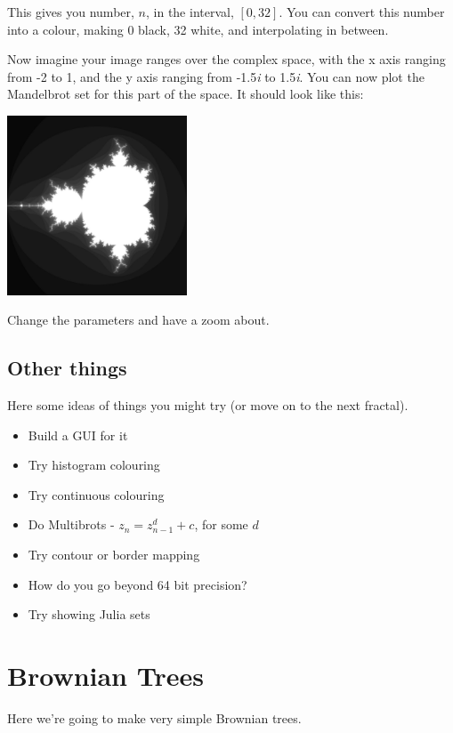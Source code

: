 \documentclass{article}
\begin{document}
        This gives you number, $n$, in the interval, $[0,32]$. You can convert this number into a colour, making 0 black, 32 white, and
        interpolating in between.
        
        Now imagine your image ranges over the complex space, with the x axis ranging from -2 to 1, and the y axis ranging from
        -1.5\emph{i} to 1.5\emph{i}. You can now plot the Mandelbrot set for this part of the space. It should look like this:
        
        \begin{center}
            \includegraphics[width=0.4\textwidth]{mandelbrot}
        \end{center}
        
        Change the parameters and have a zoom about.
        
        \subsection{Other things}
            Here some ideas of things you might try (or move on to the next fractal).
            \begin{itemize}
                \item Build a GUI for it
                \item Try histogram colouring
                \item Try continuous colouring
                \item Do Multibrots - $z_n = z_{n-1}^d + c$, for some $d$
                \item Try contour or border mapping
                \item How do you go beyond 64 bit precision?
                \item Try showing Julia sets
            \end{itemize}
        \newpage
        
    \section{Brownian Trees}
        Here we're going to make very simple Brownian trees.  
        
\end{document}
